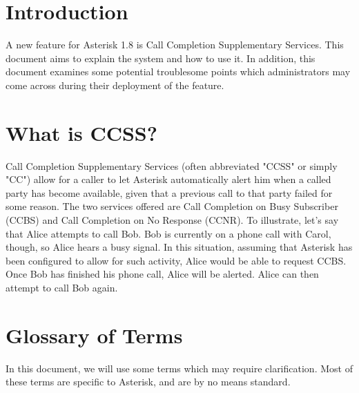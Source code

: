 \section{Introduction}

	A new feature for Asterisk 1.8 is Call Completion Supplementary
Services. This document aims to explain the system and how to use it.
In addition, this document examines some potential troublesome points
which administrators may come across during their deployment of the
feature.

\section{What is CCSS?}

	Call Completion Supplementary Services (often abbreviated "CCSS" or
simply "CC") allow for a caller to let Asterisk automatically alert him
when a called party has become available, given that a previous call to
that party failed for some reason. The two services offered are Call
Completion on Busy Subscriber (CCBS) and Call Completion on No Response
(CCNR).
	To illustrate, let's say that Alice attempts to call Bob. Bob is
currently on a phone call with Carol, though, so Alice hears a busy
signal. In this situation, assuming that Asterisk has been configured
to allow for such activity, Alice would be able to request CCBS. Once
Bob has finished his phone call, Alice will be alerted. Alice can then
attempt to call Bob again.

\section{Glossary of Terms}

	In this document, we will use some terms which may require
clarification. Most of these terms are specific to Asterisk, and are by
no means standard.

